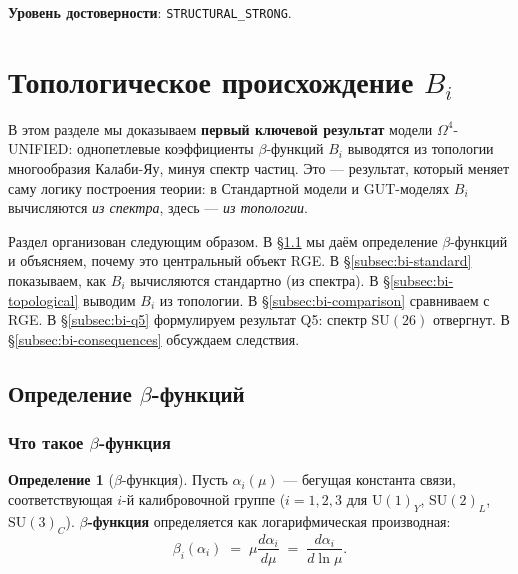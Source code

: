 \documentclass[11pt,a4paper]{article}
\newcommand{\SU}{\ensuremath{\mathrm{SU}}}
\newcommand{\Om}{\ensuremath{\Omega^4}}
\theoremstyle{definition}
\newtheorem{definition}[theorem]{Определение}
\begin{document}
\medskip\noindent
\textbf{Уровень достоверности}: \texttt{STRUCTURAL\_STRONG}.

\section{Топологическое происхождение \texorpdfstring{$B_i$}{B\_i}}
\label{sec:bi}

В этом разделе мы доказываем \textbf{первый ключевой результат}
модели $\Om$-UNIFIED: однопетлевые коэффициенты $\beta$-функций
$B_i$ выводятся из топологии многообразия Калаби-Яу, минуя спектр
частиц. Это --- результат, который меняет саму логику построения
теории: в Стандартной модели и GUT-моделях $B_i$ вычисляются
\emph{из спектра}, здесь --- \emph{из топологии}.

Раздел организован следующим образом.
В \S\ref{subsec:beta-functions-def} мы даём определение
$\beta$-функций и объясняем, почему это центральный объект RGE.
В \S\ref{subsec:bi-standard} показываем, как $B_i$ вычисляются
стандартно (из спектра).
В \S\ref{subsec:bi-topological} выводим $B_i$ из топологии.
В \S\ref{subsec:bi-comparison} сравниваем с RGE.
В \S\ref{subsec:bi-q5} формулируем результат Q5:
спектр $\SU(26)$ отвергнут.
В \S\ref{subsec:bi-consequences} обсуждаем следствия.

\subsection{Определение \texorpdfstring{$\beta$-функций}{beta-функций}}
\label{subsec:beta-functions-def}

\subsubsection{Что такое \texorpdfstring{$\beta$}{}-функция}

\begin{definition}[$\beta$-функция]
\label{def:beta-function}
Пусть $\alpha_i(\mu)$ --- бегущая константа связи, соответствующая
$i$-й калибровочной группе ($i = 1, 2, 3$ для $\mathrm{U}(1)_Y$,
$\mathrm{SU}(2)_L$, $\mathrm{SU}(3)_C$). \textbf{$\beta$-функция}
определяется как логарифмическая производная:
\begin{equation}
    \beta_i(\alpha_i) \;=\; \mu \frac{d \alpha_i}{d\mu}
    \;=\; \frac{d \alpha_i}{d \ln \mu}.
    \label{eq:beta-def}
\end{equation}
\end{definition}
\end{document}
